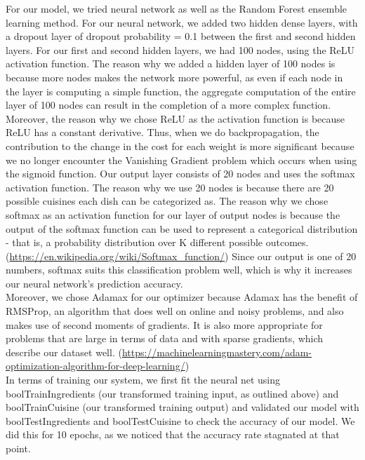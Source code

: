 \documentclass[11pt]{article}
\begin{document}
For our model, we tried neural network as well as the Random Forest ensemble learning
method. For our neural network, we added two hidden dense layers, with a
dropout layer of dropout probability = 0.1 between the first and second hidden
layers. For our first and second hidden layers, we had 100 nodes, using the ReLU
activation function. The reason why we added a hidden layer of 100 nodes
is because more nodes makes the network more powerful, as even if
each node in the layer is computing a simple function, the aggregate computation
of the entire layer of 100 nodes can result in the completion of a more
complex function. Moreover, the reason why we chose ReLU as the activation function is because
ReLU has a constant derivative. Thus, when we do backpropagation, the contribution
to the change in the cost for each weight is more significant because
we no longer encounter the Vanishing Gradient problem which occurs when using the
sigmoid function. Our output layer consists of 20 nodes and uses the softmax
activation function. The reason why we use 20 nodes is because there are 20
possible cuisines each dish can be categorized as. The reason why we chose softmax as an activation function for our layer of
output nodes is because the output of the softmax function can be used to
represent a categorical distribution - that is, a probability distribution
over K different possible outcomes. (\url{https://en.wikipedia.org/wiki/Softmax_function/})
Since our output is one of 20 numbers, softmax suits this classification problem
well, which is why it increases our neural network's prediction accuracy. \\

Moreover, we chose Adamax for our optimizer because Adamax has the benefit of RMSProp,
an algorithm that does well on online and noisy problems, and also makes
use of second moments of gradients. It is also more appropriate for problems
that are large in terms of data and with sparse gradients, which describe our
dataset well. (\url{https://machinelearningmastery.com/adam-optimization-algorithm-for-deep-learning/}) \\



In terms of training our system, we first fit the neural net using boolTrainIngredients
(our transformed training input, as outlined above) and boolTrainCuisine (our
transformed training output) and validated our model with boolTestIngredients and boolTestCuisine
to check the accuracy of our model. We did this for 10 epochs, as we noticed that
the accuracy rate stagnated at that point. \\
\end{document}
